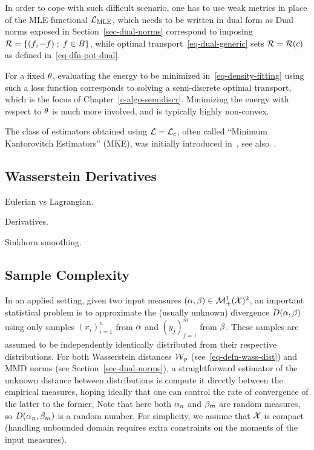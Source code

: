 In order to cope with such difficult scenario, one has to use weak metrics in place of the MLE functional $\mathcal{L}_{\text{MLE}}$, which needs to be written in dual form as 
Dual norms exposed in Section~\ref{sec-dual-norms} correspond to imposing $\mathcal{R} = \left\{ (f,-f) \;;\; f \in B \right\}$, while optimal transport~\eqref{eq-dual-generic} sets $\mathcal{R} = \mathcal{R}(c)$ as defined in~\eqref{eq-dfn-pot-dual}. 

For a fixed $\theta$, evaluating the energy to be minimized in~\eqref{eq-density-fitting} using such a loss function corresponds to solving a semi-discrete optimal transport, which is the focus of Chapter~\ref{c-algo-semidiscr}. Minimizing the energy with respect to $\theta$ is much more involved, and is typically highly non-convex.

The class of estimators obtained using $\mathcal{L}=\mathcal{L}_c$, often called ``Minimum Kantorovitch Estimators'' (MKE), was initially introduced in~\cite{bassetti2006minimum}, see also~\cite{CanasRosasco}.


\subsection{Wasserstein Derivatives}


Eulerian vs Lagrangian. 

Derivatives. 

Sinkhorn smoothing. 



\subsection{Sample Complexity}

In an applied setting, given two input measures $(\alpha,\beta) \in \mathcal{M}_+^1(\mathcal{X})^2$, an important statistical problem is to approximate the (usually unknown) divergence $D(\alpha,\beta)$ using only samples $(x_i)_{i=1}^n$ from $\alpha$ and $(y_j)_{j=1}^m$ from $\beta$. These samples are assumed to be independently identically distributed from their respective distributions. 
%
For both Wasserstein distances $\operatorname{\mathcal{W}}_p$ (see~\ref{eq-defn-wass-dist}) and MMD norms (see Section~\ref{sec-dual-norms}), a straightforward estimator of the unknown distance between distributions is compute it directly between the empirical measures, hoping ideally that one can control the rate of convergence of the latter to the former,
Note that here both $\alpha_n$ and $\beta_m$ are random measures, so $D(\alpha_n,\beta_m)$ is a random number. 
% 
For simplicity, we assume that $\mathcal{X}$ is compact (handling unbounded domain requires extra constraints on the moments of the input measures).

